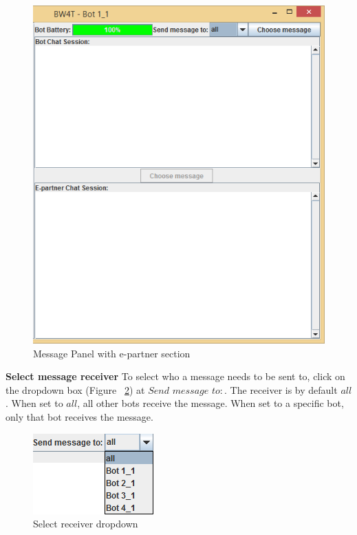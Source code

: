 \begin{figure}[h]
\begin{center}
\includegraphics{HumanPlayerGUI/hpg-right-epartner.png}
\end{center}
\caption{Message Panel with e-partner section}
\label{fig:mp2}
\end{figure}

\textbf{Select message receiver}
To select who a message needs to be sent to, click on the dropdown box (Figure ~\ref{fig:receiverDropDown}) at $Send$ $message$ $to:$. The receiver is by default $all$.
When set to $all$, all other bots receive the message. When set to a specific bot, only that bot receives the message.
\\
\begin{figure}[h]
\begin{center}
\includegraphics{HumanPlayerGUI/hpg-bot-receiver.png}
\end{center}
\caption{Select receiver dropdown}
\label{fig:receiverDropDown}
\end{figure}


